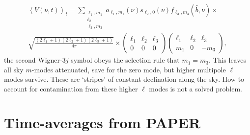 \begin{multline}
\left\langle V(\nu, t) \right\rangle_t = 
\sum_{\substack{\ell_1, m_1 \\ \ell_2 \\ \ell_3, m_3}} a_{\ell_1, m_1} (\nu) s_{\ell_2, 0} (\nu) f_{\ell_3, m_3} (\hat{b}, \nu) \times \\
\sqrt{\frac{(2\ell_1 + 1)(2\ell_2 + 1)(2\ell_3 + 1)}{4\pi}}
\times \begin{pmatrix}
\ell_1 & \ell_2 & \ell_3 \\
0 & 0 & 0
\end{pmatrix}
\begin{pmatrix}
\ell_1 & \ell_2 & \ell_3 \\
m_1 & 0 & -m_3
\end{pmatrix},
\end{multline}
the second Wigner-3$j$ symbol obeys the selection rule that $m_1 = m_3$.  This leaves all sky $m$-modes attenuated, save for the zero mode, but higher multipole $\ell$ modes survive. These are `stripes' of constant declination along the sky. How to account for contamination from these higher $\ell$ modes is not  a solved problem.


\section{Time-averages from PAPER}

